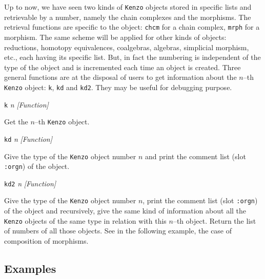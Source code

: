 Up to now, we have seen two kinds of {\tt Kenzo} objects stored in specific lists
and retrievable by a number, namely the chain complexes and the morphisms. The retrieval functions
are specific to the object: {\tt chcm} for a chain complex, {\tt mrph} for a morphism.
The same scheme will be applied for other kinds of objects: reductions, homotopy equivalences,
coalgebras, algebras, simplicial morphism, etc., each having its specific list.
But, in fact the numbering is independent
of the type of the object and is incremented each time an object is created. Three general
functions are at the disposal of users to get information about
the $n$--th {\tt Kenzo} object: {\tt k}, {\tt kd}
and {\tt kd2}. They may be useful for debugging purpose.
\vskip 0.35cm
{\parindent=0mm
{\leftskip=5mm
{\tt k} {\em n} \hfill {\em [Function]} \par}
{\leftskip=15mm
Get the $n$--th {\tt Kenzo} object. \par}
{\leftskip=5mm
{\tt kd} {\em n} \hfill {\em [Function]} \par}
{\leftskip=15mm
Give the type of the {\tt Kenzo} object number $n$ and print the comment
list (slot {\tt :orgn}) of the object. \par}
{\leftskip=5mm
{\tt kd2} {\em n} \hfill {\em [Function]} \par}
{\leftskip=15mm
Give the type of the {\tt Kenzo} object number $n$, print the comment
list (slot {\tt :orgn}) of the object and recursively, give the same kind of information
about all the {\tt Kenzo} objects of the same type in relation with this $n$--th object.
Return the list of numbers of all those objects.
See in the following example, the case of composition of morphisms. \par}
}

\subsection* {Examples}

